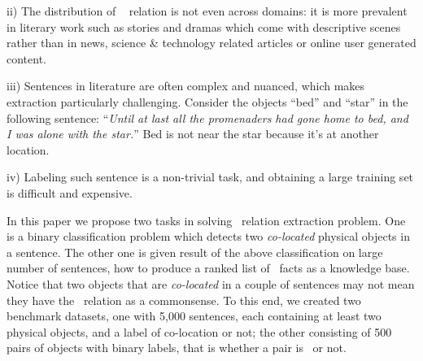ii) The distribution of \lnear~ relation is not even across domains: 
it is more prevalent in literary work such as stories 
and dramas which come with descriptive scenes rather
than in news, science \& technology related articles or online user 
generated content. 

iii) Sentences in literature are often complex and nuanced, 
which makes extraction particularly challenging. Consider the objects
``bed'' and ``star'' in the following
sentence: ``{\em Until at last all the promenaders had gone home to bed, 
and I was alone with the star.}'' Bed is not near the star
because it's at another location.

iv) Labeling such sentence is a non-trivial task, 
and obtaining a large training set is difficult and expensive.



In this paper we propose two tasks in solving \lnear\ relation
extraction problem. One is a binary classification problem which detects
two {\em co-located} physical objects in a sentence. 
The other one is given result of the above classification on
large number of sentences, how to produce a ranked list of \lnear\
facts as a knowledge base.
Notice that two objects that are {\em co-located} in a couple of sentences
may not mean they have the \lnear\ relation as a commonsense.
To this end, we created two 
benchmark datasets, one with 5,000 sentences, 
each containing at least two physical objects,
and a label of co-location or not; the other consisting of 500 pairs of
objects with binary labels, that is whether a pair is \lnear\ or not.  

%

